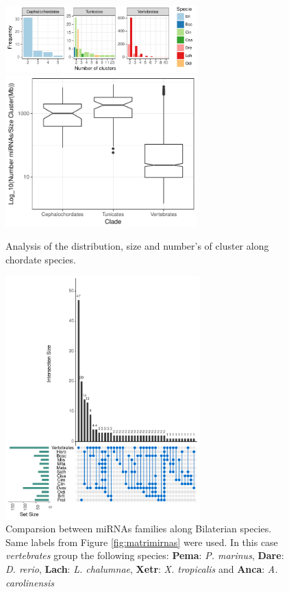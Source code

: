 \documentclass[graybox]{svmult}
\begin{document}
\begin{figure}[t]
\sidecaption[t]
\includegraphics[width=7.4cm]{./Images/cluster_number.pdf} \\ 
\includegraphics[width=7.4cm]{./Images/density.pdf} 
\caption{Analysis of the distribution, size and number's of cluster along chordate species.}
\label{fig:sizeCluster}
\end{figure}

\begin{figure}[t]
\sidecaption[t]
\includegraphics[width=7.5cm]{./Images/vennmiRNAs}
\caption{Comparsion between miRNAs families along Bilaterian species. Same 
labels from Figure \ref{fig:matrimirnas} were used. In this case 
\textsl{vertebrates} group the following species: \textbf{Pema}: \textit{P. 
marinus}, \textbf{Dare}: \textit{D. rerio}, \textbf{Lach}: \textit{L. 
chalumnae}, \textbf{Xetr}: \textit{X. tropicalis} and \textbf{Anca}: \textit{A. 
carolinensis}}
\label{fig:vennDiagram}
\end{figure}
\end{document}
